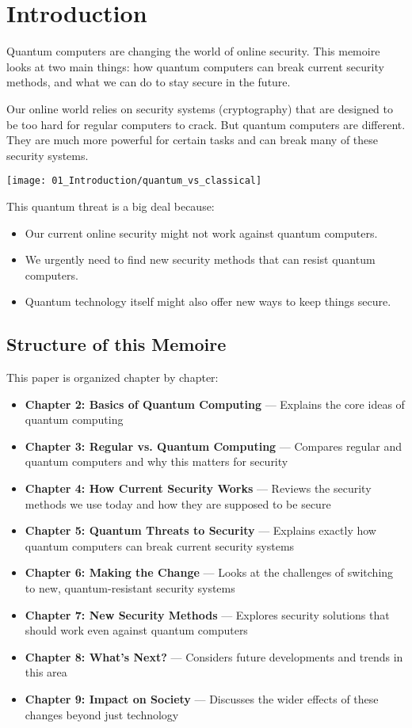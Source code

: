 \chapter{Introduction}\label{chap:introduction}

Quantum computers are changing the world of online security. This memoire looks at two main things: how quantum computers can break current security methods, and what we can do to stay secure in the future.

Our online world relies on security systems (cryptography) that are designed to be too hard for regular computers to crack. But quantum computers are different. They are much more powerful for certain tasks and can break many of these security systems.

\texttt{[image: 01\_Introduction/quantum\_vs\_classical]}

This quantum threat is a big deal because:
\begin{itemize}
    \item Our current online security might not work against quantum computers.
    \item We urgently need to find new security methods that can resist quantum computers.
    \item Quantum technology itself might also offer new ways to keep things secure.
\end{itemize}

\section{Structure of this Memoire}

This paper is organized chapter by chapter:
\begin{itemize}
    \item \textbf{Chapter 2: Basics of Quantum Computing} --- Explains the core ideas of quantum computing
    \item \textbf{Chapter 3: Regular vs. Quantum Computing} --- Compares regular and quantum computers and why this matters for security
    \item \textbf{Chapter 4: How Current Security Works} --- Reviews the security methods we use today and how they are supposed to be secure
    \item \textbf{Chapter 5: Quantum Threats to Security} --- Explains exactly how quantum computers can break current security systems
    \item \textbf{Chapter 6: Making the Change} --- Looks at the challenges of switching to new, quantum-resistant security systems
    \item \textbf{Chapter 7: New Security Methods} --- Explores security solutions that should work even against quantum computers
    \item \textbf{Chapter 8: What's Next?} --- Considers future developments and trends in this area \parencite{preskill2018quantum}
    \item \textbf{Chapter 9: Impact on Society} --- Discusses the wider effects of these changes beyond just technology
\end{itemize}